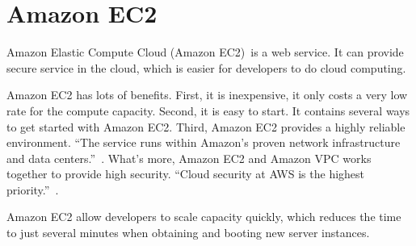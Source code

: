 \section{Amazon EC2}
Amazon Elastic Compute Cloud (Amazon EC2)~\cite{www-amazonec2}is 
a web service. It can provide secure service in the cloud, which is
easier for developers to do cloud computing.

Amazon EC2 has lots of benefits. First, it is inexpensive, it only 
costs a very low rate for the compute capacity. Second, it is easy to
start. It contains several ways to get started with Amazon EC2. Third,
Amazon EC2 provides a highly reliable environment. ``The service runs 
within Amazon’s proven network infrastructure and data centers.''~\cite{www-amazonec2}.
What's more, Amazon EC2 and Amazon VPC works together to provide high
security. ``Cloud security at AWS is the highest priority.''~\cite{www-amazonec2}.


Amazon EC2 allow developers to scale capacity quickly, which reduces
the time to just several minutes when obtaining and booting new server
instances. 
